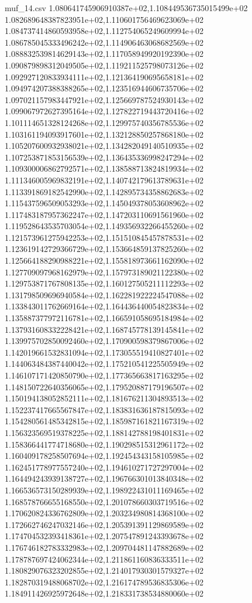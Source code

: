 \begin{filecontents*}{muf_14.csv}
1.080641745906910387e+02,1.108449536735015499e+02
1.082689648387823951e+02,1.110601756469623069e+02
1.084737414860593958e+02,1.112754065249609994e+02
1.086785045333496242e+02,1.114906463068682569e+02
1.088832539814629143e+02,1.117058949920192390e+02
1.090879898312049505e+02,1.119211525798073126e+02
1.092927120833934111e+02,1.121364190695658181e+02
1.094974207388388265e+02,1.123516944606735706e+02
1.097021157983447921e+02,1.125669787524930143e+02
1.099067972627395164e+02,1.127822719443720416e+02
1.101114651328124268e+02,1.129975740356785536e+02
1.103161194093917601e+02,1.132128850257868180e+02
1.105207600932938021e+02,1.134282049140510935e+02
1.107253871853156539e+02,1.136435336998247294e+02
1.109300006862792571e+02,1.138588713824819934e+02
1.111346005969832191e+02,1.140742179613789631e+02
1.113391869182542990e+02,1.142895734358862683e+02
1.115437596509053293e+02,1.145049378053608962e+02
1.117483187957362247e+02,1.147203110691561960e+02
1.119528643535703054e+02,1.149356932266455260e+02
1.121573961275942253e+02,1.151510845457878531e+02
1.123619142729366729e+02,1.153664859137825260e+02
1.125664188290988221e+02,1.155818973661162090e+02
1.127709097968162979e+02,1.157973189021122380e+02
1.129753871767808135e+02,1.160127505211112293e+02
1.131798509696940584e+02,1.162281922224547088e+02
1.133843011762669164e+02,1.164436440054823834e+02
1.135887377972116781e+02,1.166591058695184984e+02
1.137931608332228421e+02,1.168745778139145841e+02
1.139975702850092460e+02,1.170900598379867006e+02
1.142019661532831094e+02,1.173055519410827401e+02
1.144063484387440042e+02,1.175210541225505949e+02
1.146107171420850790e+02,1.177365663817163295e+02
1.148150722640356065e+02,1.179520887179196507e+02
1.150194138052852111e+02,1.181676211304893513e+02
1.152237417665567847e+02,1.183831636187815093e+02
1.154280561485342815e+02,1.185987161821167319e+02
1.156323569519378225e+02,1.188142788198401831e+02
1.158366441774718680e+02,1.190298515312961172e+02
1.160409178258507694e+02,1.192454343158105985e+02
1.162451778977557240e+02,1.194610271727297004e+02
1.164494243939138727e+02,1.196766301013840348e+02
1.166536573150289939e+02,1.198922431011169465e+02
1.168578766655168550e+02,1.201078660303719516e+02
1.170620824336762809e+02,1.203234980814368100e+02
1.172662746247032146e+02,1.205391391129869589e+02
1.174704532393418361e+02,1.207547891243393678e+02
1.176746182783332983e+02,1.209704481147882689e+02
1.178787697424062344e+02,1.211861160836333511e+02
1.180829076323202855e+02,1.214017930301579327e+02
1.182870319488068702e+02,1.216174789536835306e+02
1.184911426925972648e+02,1.218331738534880060e+02

\end{filecontents*}
